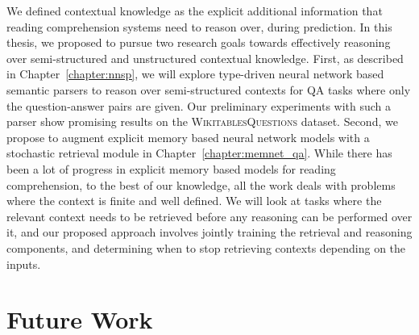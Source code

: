 We defined contextual knowledge as the explicit additional information that reading comprehension systems need to reason over, during prediction. In this thesis, we proposed to pursue two research goals towards effectively reasoning over semi-structured and unstructured contextual knowledge.
First, as described in Chapter~\ref{chapter:nnsp}, we will explore type-driven neural network based semantic parsers to reason over semi-structured contexts for QA tasks where only the question-answer pairs are given. Our preliminary experiments with such a parser show promising
results on the \textsc{WikitablesQuestions} dataset. Second, we propose to augment explicit memory based neural network models with a stochastic retrieval module in Chapter~\ref{chapter:memnet_qa}. While there has been a lot of progress in explicit memory based models for reading comprehension, to the best of our knowledge, all the
work deals with problems where the context is finite and well defined. We will look at tasks where the relevant context needs to be retrieved before any reasoning can be performed over it, and our proposed approach involves jointly training the retrieval and reasoning components, and determining
when to stop retrieving contexts depending on the inputs.

\section{Future Work}
